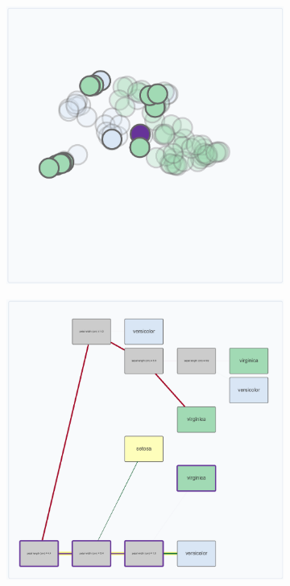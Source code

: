 \begin{figure}[htbp]
    \begin{subfigure}[c]{0.325\textwidth}
        \includegraphics[width=\linewidth]{images/teacherVariousInteractionsBlocksScatter3.png}
    \end{subfigure}
    \begin{subfigure}[c]{0.325\textwidth}
        \includegraphics[width=\linewidth]{images/teacherVariousInteractionsBlocks3.png}
    \end{subfigure}


\end{figure}
